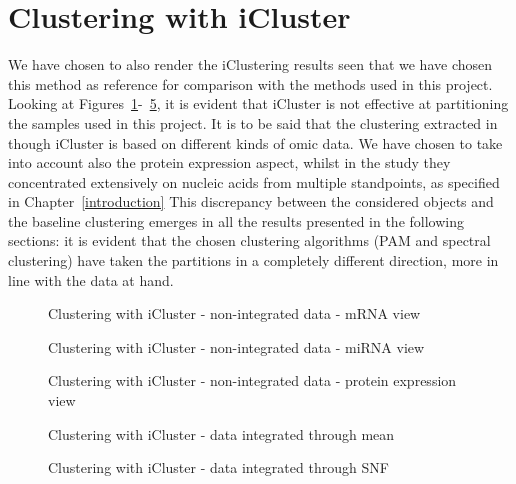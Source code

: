 \section{Clustering with iCluster}\label{results_iCluster}
We have chosen to also render the iClustering results seen that we have chosen this method as reference for comparison with the methods used in this project. Looking at Figures~\ref{fig:iCluster_1}-~\ref{fig:iCluster_SNF}, it is evident that iCluster is not effective at partitioning the samples used in this project. It is to be said that the clustering extracted in~\cite{abeshouse2015molecularPRAD} though iCluster is based on different kinds of omic data. We have chosen to take into account also the protein expression aspect, whilst in the study they concentrated extensively on nucleic acids from multiple standpoints, as specified in Chapter~\ref{introduction} This discrepancy between the considered objects and the baseline clustering emerges in all the results presented in the following sections: it is evident that the chosen clustering algorithms (PAM and spectral clustering) have taken the partitions in a completely different direction, more in line with the data at hand.
\begin{figure}[!]\label{fig:iCluster_1}
    \centering
    \caption{Clustering with iCluster - non-integrated data - mRNA view}
\end{figure}
\begin{figure}[!]\label{fig:iCluster_2}
    \centering
    \caption{Clustering with iCluster - non-integrated data - miRNA view}
\end{figure}
\begin{figure}[!]\label{fig:iCluster_3}
    \centering
    \caption{Clustering with iCluster - non-integrated data - protein expression view}
\end{figure}
\begin{figure}[!]\label{fig:iCluster_mean}
    \centering
    \caption{Clustering with iCluster - data integrated through mean}
\end{figure}
\begin{figure}[!]\label{fig:iCluster_SNF}
    \centering
    \caption{Clustering with iCluster - data integrated through SNF}
\end{figure}
